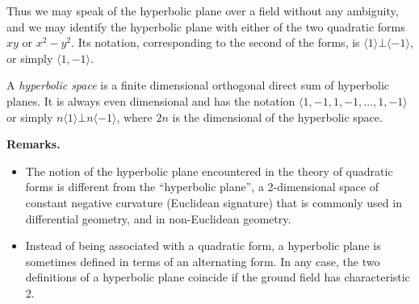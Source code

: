 \documentclass[12pt]{article}
\begin{document}
Thus we may speak of the hyperbolic plane over a field without any ambiguity, and we may identify the hyperbolic plane with either of the two quadratic forms $xy$ or $x^2-y^2$.  Its notation, corresponding to the second of the forms, is $\langle 1\rangle \bot\langle-1\rangle$, or simply $\langle 1,-1\rangle$.

A \emph{hyperbolic space} is a finite dimensional orthogonal direct sum of hyperbolic planes.  It is always even dimensional and has the notation 
$\langle 1,-1,1,-1,\ldots,1,-1\rangle$ or simply $n\langle 1\rangle\bot n\langle -1\rangle$, where $2n$ is the dimensional of the hyperbolic space.

\textbf{Remarks.}  
\begin{itemize}
\item The notion of the hyperbolic plane encountered in the theory of quadratic forms is different from the ``hyperbolic plane'', a 2-dimensional space of constant negative curvature (Euclidean signature) that is commonly used in differential geometry, and in non-Euclidean geometry.
\item Instead of being associated with a quadratic form, a hyperbolic plane is sometimes defined in terms of an alternating form.  In any case, the two definitions of a hyperbolic plane coincide if the ground field has characteristic 2.
\end{itemize}
\end{document}
